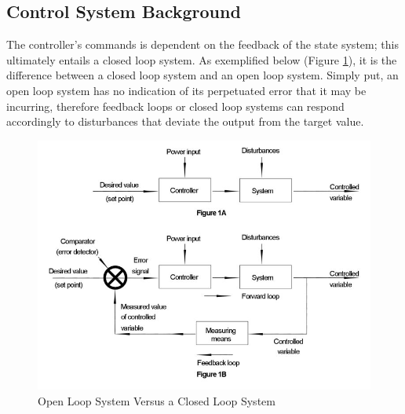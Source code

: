 \documentclass[12pt]{article}
\begin{document}
\subsection{Control System Background}
The controller's commands is dependent on the feedback of the state system; this ultimately entails a closed loop system. As exemplified below (Figure \ref{fig:loops}), it is the difference between a closed loop system and an open loop system. Simply put, an open loop system has no indication of its perpetuated error that it may be incurring, therefore feedback loops or closed loop systems can respond accordingly to disturbances that deviate the output from the target value.
\begin{figure}[H]
    \centering
    \includegraphics[width=.70\linewidth]{figures/closedopenloop.jpg}
    \caption{Open Loop System Versus a Closed Loop System \cite{OCLoop}}
    \label{fig:loops}
\end{figure}
\end{document}
